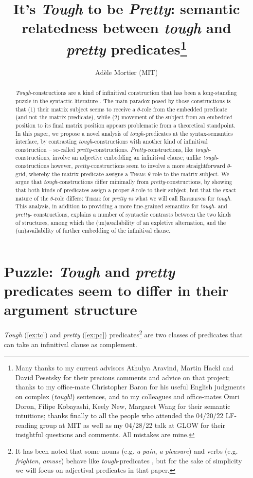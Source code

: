 \documentclass[11pt]{article}
\title{It's \textit{Tough} to be \textit{Pretty}: semantic relatedness between \textit{tough} and \textit{pretty} predicates\footnote{Many thanks to my current advisors Athulya Aravind, Martin Hackl and David Pesetsky for their precious comments and advice on that project; thanks to my office-mate Christopher Baron for his useful English judgments on complex (\textit{tough}!) sentences, and to my colleagues and office-mates Omri Doron, Filipe Kobayashi, Keely New, Margaret Wang for their semantic intuitions; thanks finally to all the people who attended the 04/20/22 LF-reading group at MIT as well as my 04/28/22 talk at GLOW for their insightful questions and comments. All mistakes are mine.}}
\author{Adèle Mortier (MIT)}
\let\ACMmaketitle=\maketitle
\renewcommand{\maketitle}{\begingroup\let\footnote=\thanks \ACMmaketitle\endgroup}
\begin{document}
\sloppy
\maketitle

\begin{abstract}
	\textit{Tough}-constructions are a kind of infinitival construction that has been a long-standing puzzle in the syntactic literature \cite{Lees1960, Chomsky1964,Rosenbaum1967}. The main paradox posed by those constructions is that (1) their matrix subject seems to receive a $\theta$-role from the embedded predicate (and not the matrix predicate), while (2) movement of the subject from an embedded position to its final matrix position appears problematic from a theoretical standpoint. In this paper, we propose a novel analysis of \textit{tough}-predicates at the syntax-semantics interface, by contrasting \textit{tough}-constructions with another kind of infinitival construction -- so-called \textit{pretty}-constructions. \textit{Pretty}-constructions, like \textit{tough}-constructions, involve an adjective embedding an infinitival clause; unlike \textit{tough}-constructions however, \textit{pretty}-constructions seem to involve a more straightforward $\theta$-grid, whereby the matrix predicate assigns a \textsc{Theme} $\theta$-role to the matrix subject. We argue that \textit{tough}-constructions differ minimally from \textit{pretty}-constructions, by showing that both kinds of predicates assign a proper $\theta$-role to their subject, but that the exact nature of the $\theta$-role differs: \textsc{Theme} for \textit{pretty} \textit{vs} what we will call \textsc{Reference} for \textit{tough}. This analysis, in addition to providing a more fine-grained semantics for \textit{tough}- and \textit{pretty}- constructions, explains a number of syntactic contrasts between the two kinds of structures, among which the (un)availability of an expletive alternation, and the (un)availability of further embedding of the infinitival clause.
\end{abstract}
\newpage
\tableofcontents
\newpage
\section{Puzzle: \textit{Tough} and \textit{pretty} predicates seem to differ in their argument structure}\label{sec:puzzle}
\textit{Tough} (\ref{ex:tc}) and \textit{pretty} (\ref{ex:pc}) predicates\footnote{It has been noted that some nouns (e.g. \textit{a pain}, \textit{a pleasure}) and verbs (e.g. \textit{frighten}, \textit{amuse}) behave like \textit{tough}-predicates \cite{Lasnik1974,Pesetsky1987, Gluckman2019}, but for the sake of simplicity we will focus on adjectival predicates in that paper.} are two classes of predicates that can take an infinitival clause as complement.
\begin{exe}
	\ex 
	\begin{xlist}
		\label{ex:tc}
		\label{ex:pc} 
	\end{xlist}\label{ex:tc-pc}
\end{exe}
\end{document}
